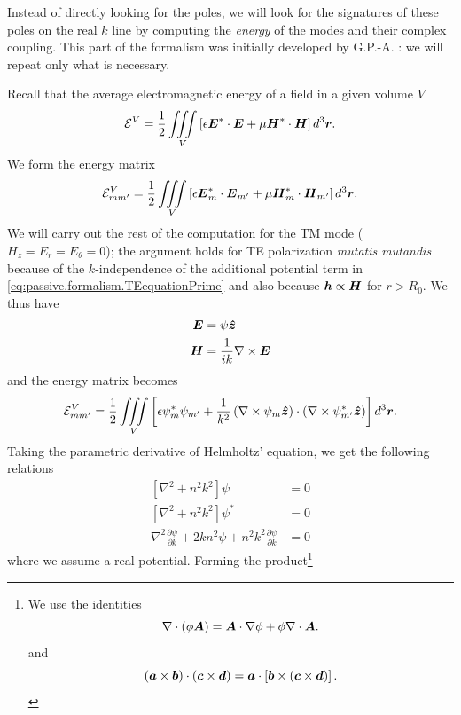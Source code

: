 Instead of directly looking for the poles, we will look for the signatures
of these poles on the real $k$ line by computing the \textit{energy}
of the modes and their complex coupling. This part of the formalism
was initially developed by G.P.-A. \cite{GAP2013a}: we will repeat
only what is necessary. 

Recall that the average electromagnetic energy of a field
in a given volume $V$
  \begin{equation}
   \mathcal{E}^V = \frac{1}{2}\mathop{\iiint}_V\left[\epsilon\boldsymbol{E}^*\cdot\boldsymbol{E}+\mu\boldsymbol{H}^*\cdot\boldsymbol{H}\right]d^3\boldsymbol{r}.
  \end{equation}
We form the energy matrix 
  \begin{equation}
   \mathcal{E}^V_{mm'} = \frac{1}{2}\mathop{\iiint}_V\left[\epsilon\boldsymbol{E}^*_m\cdot\boldsymbol{E}_{m'}+\mu\boldsymbol{H}^*_m\cdot\boldsymbol{H}_{m'}\right]d^3\boldsymbol{r}.
  \end{equation}
We will carry out the rest of the computation for the TM mode ($H_z=E_r=E_\theta=0$);
the argument holds for TE polarization \textit{mutatis mutandis} because of the
$k$-independence of the additional potential term in \eqref{eq:passive.formalism.TEequationPrime}
and also because $\boldsymbol{h}\propto\boldsymbol{H}$ for $r>R_0$. We thus have 
  \begin{align*}
    \boldsymbol{E}	&= \psi\boldsymbol{\hat{z}}	\\
    \boldsymbol{H}	&= \frac{1}{ik}\nabla\times\boldsymbol{E}
  \end{align*}
and the energy matrix becomes
\begin{align}
    \mathcal{E}^V_{mm'}	&= \frac{1}{2}\mathop{\iiint}_V\left[\epsilon\psi^*_{m}\psi_{m'}+\frac{1}{k^2}\left(\nabla\times\psi_{m}\boldsymbol{\hat{z}}\right)\cdot\left(\nabla\times\psi^*_{m'}\boldsymbol{\hat{z}}\right)\right]d^3\boldsymbol{r}.	\nonumber\\
  \end{align}
Taking the parametric derivative of Helmholtz' equation, we get the 
following relations
  \begin{subequations}
  \label{eq:passive.formalism.parametricHelmholtz}
  \begin{align}
   \left[\nabla^2+n^2k^2\right]\psi								&=0	\\
   \left[\nabla^2+n^2k^2\right]\psi^*								&=0	\\
   \nabla^2\frac{\partial\psi}{\partial k}+2kn^2\psi+n^2k^2\frac{\partial\psi}{\partial k}	&=0
  \end{align}
  \end{subequations}
where we assume a real potential.
Forming the product\footnote{We use the identities \cite[Appendix II]{STR41}
  \begin{equation*}
    \nabla\cdot\left(\phi\boldsymbol{A}\right) = \boldsymbol{A}\cdot\nabla\phi+\phi\nabla\cdot\boldsymbol{A}.
  \end{equation*}
and
  \begin{equation*}
    (\boldsymbol{a}\times\boldsymbol{b})\cdot(\boldsymbol{c}\times\boldsymbol{d}) = \boldsymbol{a}\cdot\left[\boldsymbol{b}\times(\boldsymbol{c}\times\boldsymbol{d})\right].
  \end{equation*}
}
